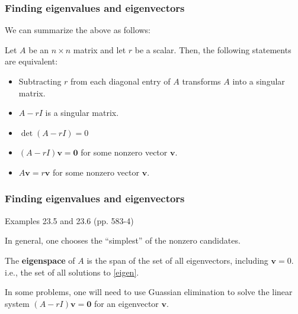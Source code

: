 \documentclass[10pt, handout]{beamer}
\begin{document}
\begin{frame}
\frametitle{Finding eigenvalues and eigenvectors}

We can summarize the above as follows:
\begin{theorem}[23.3]\label{th23.3}
Let $A$ be an $n \times n$ matrix and let $r$ be a scalar. Then, the following statements are equivalent:
\begin{itemize}
\item[(a)] Subtracting $r$ from each diagonal entry of $A$ transforms $A$ into a singular matrix.
\item[(b)] $A - r I$ is a singular matrix.
\item[(c)] {\color{red}$\det(A - r I) = 0$}
\item[(d)] {\color{red}$(A - r I)\mathbf{v} = \mathbf{0}$} for some nonzero vector $\mathbf{v}$.
\item[(e)] $A\mathbf{v}  = r\mathbf{v}$ for some nonzero vector $\mathbf{v}$.
\end{itemize}
\end{theorem}
\end{frame}


\begin{frame}
\frametitle{Finding eigenvalues and eigenvectors}

\begin{example}
Examples 23.5 and 23.6 (pp. 583-4)
\end{example}

In general, one chooses the ``simplest'' of the nonzero candidates.
\vskip0.1in

The \textbf{eigenspace} of $A$ is the span of the set of all eigenvectors, including $\mathbf{v} = 0$. i.e., the set of all solutions to \eqref{eigen}. \vskip0.1in

In some problems, one will need to use Guassian elimination to solve the linear system $(A - r I)\mathbf{v} = \mathbf{0}$ for an eigenvector $\mathbf{v}$.

\end{frame}
\end{document}
